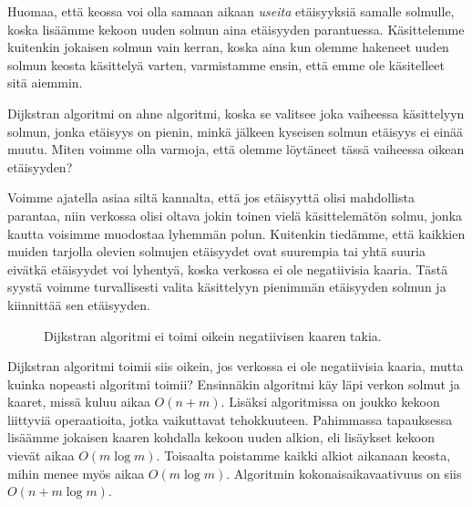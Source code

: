 Huomaa, että keossa voi olla samaan aikaan \emph{useita} etäisyyksiä
samalle solmulle, koska lisäämme kekoon uuden solmun
aina etäisyyden parantuessa.
Käsittelemme kuitenkin jokaisen solmun vain kerran,
koska aina kun olemme hakeneet uuden solmun keosta käsittelyä varten,
varmistamme ensin, että emme ole käsitelleet sitä aiemmin.

Dijkstran algoritmi on ahne algoritmi,
koska se valitsee joka vaiheessa käsittelyyn solmun,
jonka etäisyys on pienin, minkä jälkeen kyseisen
solmun etäisyys ei einää muutu.
Miten voimme olla varmoja, että olemme löytäneet
tässä vaiheessa oikean etäisyyden?

Voimme ajatella asiaa siltä kannalta,
että jos etäisyyttä olisi mahdollista parantaa,
niin verkossa olisi oltava jokin toinen vielä
käsittelemätön solmu, jonka kautta voisimme muodostaa lyhemmän polun.
Kuitenkin tiedämme, että kaikkien muiden tarjolla olevien solmujen
etäisyydet ovat suurempia tai yhtä suuria eivätkä etäisyydet voi lyhentyä,
koska verkossa ei ole negatiivisia kaaria.
Tästä syystä voimme turvallisesti valita käsittelyyn pienimmän etäisyyden
solmun ja kiinnittää sen etäisyyden.

\begin{figure}
\center
\begin{center}
\end{center}
\caption{Dijkstran algoritmi ei toimi oikein negatiivisen kaaren takia.}
\label{fig:dijneg}
\end{figure}

Dijkstran algoritmi toimii siis oikein,
jos verkossa ei ole negatiivisia kaaria,
mutta kuinka nopeasti algoritmi toimii?
Ensinnäkin algoritmi käy läpi verkon solmut
ja kaaret, missä kuluu aikaa $O(n+m)$.
Lisäksi algoritmissa on joukko kekoon liittyviä operaatioita,
jotka vaikuttavat tehokkuuteen.
Pahimmassa tapauksessa lisäämme jokaisen kaaren kohdalla
kekoon uuden alkion, eli lisäykset kekoon vievät aikaa $O(m \log m)$.
Toisaalta poistamme kaikki alkiot aikanaan keosta,
mihin menee myös aikaa $O(m \log m)$.
Algoritmin kokonaisaikavaativuus on siis $O(n + m \log m)$.

